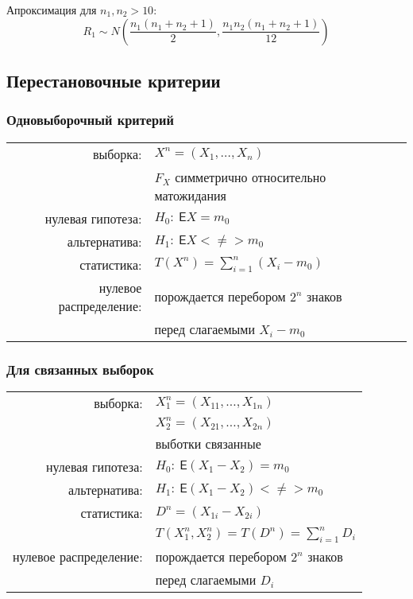\documentclass[a4paper,12pt]{article}
\newcommand{\Expect}{\mathsf{E}}
\begin{document}
Апроксимация для $n_{1}, n_{2} > 10$:
\[
R_{1} \sim N\left( \dfrac{n_{1}(n_{1}+n_{2}+1)}{2}, \dfrac{n_{1}n_{2}(n_{1}+n_{2}+1)}{12} \right)
\]

\pagebreak

\subsection{Перестановочные критерии}

\subsubsection{Одновыборочный критерий}

\begin{table}[h]
	\begin{tabular}{rl}
выборка:& $ X^{n} = \left( X_{1}, \ldots, X_{n} \right) $ \\
       & $ F_{X} $ симметрично относительно матожидания \\
нулевая гипотеза: & $ H_{0}:~ \Expect X = m_{0} $ \\
альтернатива: & $ H_{1}:~ \Expect X <\neq> m_{0} $ \\
статистика: & $ T\left( X^{n} \right) = \sum\limits_{i=1}^{n} (X_{i} - m_{0}) $ \\
нулевое распределение: & порождается перебором $2^{n}$ знаков \\
                   & перед слагаемыми $ X_{i} - m_{0} $
	\end{tabular}
\end{table}

\subsubsection{Для связанных выборок}

\begin{table}[h]
	\begin{tabular}{rl}
выборка:& $ X_{1}^{n} = \left( X_{11}, \ldots, X_{1n} \right) $ \\
       & $ X_{2}^{n} = \left( X_{21}, \ldots, X_{2n} \right) $ \\
       & выботки связанные \\
нулевая гипотеза: & $ H_{0}:~ \Expect (X_{1} - X_{2}) = m_{0} $ \\
альтернатива: & $ H_{1}:~ \Expect (X_{1} - X_{2}) <\neq> m_{0} $ \\
статистика: & $ D^{n} = (X_{1i} - X_{2i}) $ \\
          & $ T\left( X_{1}^{n}, X_{2}^{n} \right) = T(D^{n}) = \sum\limits_{i=1}^{n} D_{i} $ \\
нулевое распределение: & порождается перебором $2^{n}$ знаков \\
                   & перед слагаемыми $ D_{i} $
	\end{tabular}
\end{table}
\end{document}

